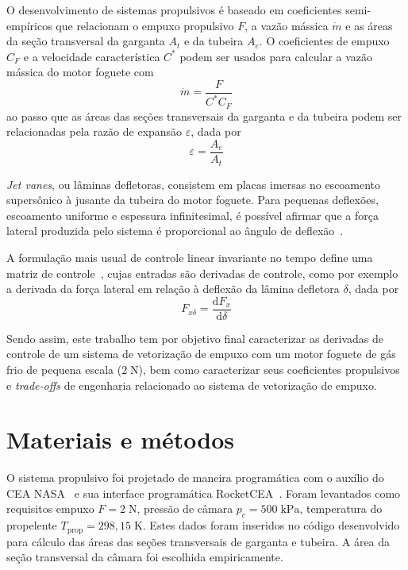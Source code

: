 \documentclass[
	article,			%
	10pt,				%
	oneside,			%
	a4paper,			%
  twocolumn,			%
	english,			%
	brazil,				%
	sumario=tradicional,
	]{abntex2}
\begin{document}
O desenvolvimento de sistemas propulsivos é baseado em coeficientes semi-empíricos que relacionam o empuxo propulsivo \(F\), a vazão mássica \(\dot{m}\) e as áreas da seção transversal da garganta \(A_t\) e da tubeira \(A_e\). O coeficientes de empuxo \(C_F\) e a velocidade característica \(C^*\) podem ser usados para calcular a vazão mássica do motor foguete com~\cite{Sutton}
\begin{equation}
  \label{eq:mass_flow}
  \dot{m} = \frac{F}{C^* C_F}
\end{equation}
ao passo que as áreas das seções transversais da garganta e da tubeira podem ser relacionadas pela razão de expansão \(\varepsilon\), dada por
\begin{equation}
  \varepsilon = \frac{A_e}{A_t}\label{eq:exp_ratio}
\end{equation} 

\textit{Jet vanes}, ou lâminas defletoras, consistem em placas imersas no escoamento supersônico à jusante da tubeira do motor foguete. Para pequenas deflexões, escoamento uniforme e espessura infinitesimal, é possível afirmar que a força lateral produzida pelo sistema é proporcional ao ângulo de deflexão~\cite{anderson}. 

A formulação mais usual de controle linear invariante no tempo define uma matriz de controle~\cite{fbsys}, cujas entradas são derivadas de controle, como por exemplo a derivada da força lateral em relação à deflexão da lâmina defletora \(\delta \), dada por
\begin{equation}
  F_{x\delta} = \frac{\mathrm{d} F_x}{\mathrm{d} \delta}\label{eq:control_derivative}
\end{equation}

Sendo assim, este trabalho tem por objetivo final caracterizar as derivadas de controle de um sistema de vetorização de empuxo com um motor foguete de gás frio de pequena escala (\(2\;\mathrm{N}\)), bem como caracterizar seus coeficientes propulsivos e \textit{trade-offs} de engenharia relacionado ao sistema de vetorização de empuxo.

\section{Materiais e métodos}

O sistema propulsivo foi projetado de maneira programática com o auxílio do CEA NASA~\cite{ceanasa} e sua interface programática RocketCEA~\cite{rocketcea}. Foram levantados como requisitos empuxo \(F = 2\;\mathrm{N}\), pressão de câmara \(p_c = 500\;\mathrm{kPa}\), temperatura do propelente \(T_{\mathrm{prop}} = 298,15\;\mathrm{K}\). Estes dados foram inseridos no código desenvolvido para cálculo das áreas das seções transversais de garganta e tubeira. A área da seção transversal da câmara foi escolhida empiricamente.
\end{document}
